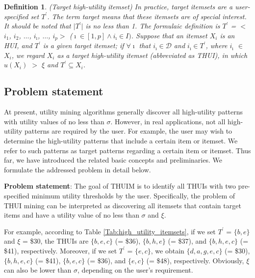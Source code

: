 \documentclass[journal]{IEEEtran}
\newtheorem{definition}{Definition}[section]
\begin{document}
\begin{definition}
	\rm  (\textit{Target high-utility itemset}) In practice, target itemsets are a user-specified set $T^\prime$. The term target means that these itemsets are of special interest. It should be noted that $\mid$$T^\prime$$\mid$ is no less than 1. The formulaic definition is $T^\prime$ = $<$$i_1$, $i_2$, $\dots$, $i_\imath$, $\dots$, $i_p$$>$ ($\imath \in [1, p] \wedge i_\imath \in I)$. Suppose that an itemset $X_i$ is an HUI, and $T^\prime$ is a given target itemset; if $\forall$$\imath$ that $i_\imath \in \mathcal{D}$ and $i_\imath \in T^\prime$, where $i_\imath$ $\in$ $X_i$, we regard $X_i$ as a target high-utility itemset (abbreviated as \textit{THUI}), in which $u(X_i)$ $>$ $\xi$ and $T^ \prime \subseteq X_i$.
\end{definition}



\subsection{Problem statement}

At present, utility mining algorithms generally discover all high-utility patterns with utility values of no less than $\sigma$. However, in real applications, not all high-utility patterns are required by the user. For example, the user may wish to determine the high-utility patterns that include a certain item or itemset. We refer to such patterns as target patterns regarding a certain item or itemset. Thus far, we have introduced the related basic concepts and preliminaries. We formulate the addressed problem in detail below. 

\textbf{Problem statement}: The goal of THUIM is to identify all THUIs with two pre-specified minimum utility thresholds by the user. Specifically, the problem of THUI mining can be interpreted as discovering all itemsets that contain target items and have a utility value of no less than $\sigma$ and $\xi$.

For example, according to Table \ref{Tab:high_utility_itemsets}, if we set $T^\prime$ = $\{b, e\}$ and $\xi$ = \$30, the THUIs are $\{b, e, c\}$ (= \$36), $\{b, h, e\}$ (= \$37), and $\{b, h, e, c\}$ (= \$41), respectively. Moreover, if we set $T^\prime$ = $\{e, c\}$, we obtain $\{d, a, g, e, c\}$ (= \$30), $\{b, h, e, c\}$ (= \$41), $\{b, e, c\}$ (= \$36), and $\{e, c\}$ (= \$48), respectively. Obviously, $\xi$ can also be lower than $\sigma$, depending on the user's requirement.
\end{document}
